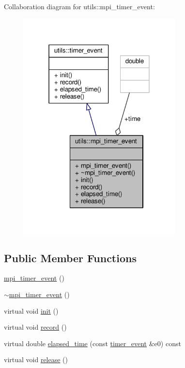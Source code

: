 Collaboration diagram for utils\-:\-:mpi\-\_\-timer\-\_\-event\-:\nopagebreak
\begin{figure}[H]
\begin{center}
\leavevmode
\includegraphics[width=235pt]{structutils_1_1mpi__timer__event__coll__graph}
\end{center}
\end{figure}
\subsection*{Public Member Functions}
\begin{DoxyCompactItemize}
\item 
\hyperlink{structutils_1_1mpi__timer__event_ae2772a320fa0db06f2634fded07de40f}{mpi\-\_\-timer\-\_\-event} ()
\item 
\hyperlink{structutils_1_1mpi__timer__event_aca22e55f931fd380b31024d3273229b5}{$\sim$mpi\-\_\-timer\-\_\-event} ()
\item 
virtual void \hyperlink{structutils_1_1mpi__timer__event_a0527b2cb58983cc22521a79cadada734}{init} ()
\item 
virtual void \hyperlink{structutils_1_1mpi__timer__event_a7c3bae9bcc4ec16fa7eef35fc03b8326}{record} ()
\item 
virtual double \hyperlink{structutils_1_1mpi__timer__event_a45dae6ae22f26fcaa7ff8c6f417e7bbe}{elapsed\-\_\-time} (const \hyperlink{structutils_1_1timer__event}{timer\-\_\-event} \&e0) const 
\item 
virtual void \hyperlink{structutils_1_1mpi__timer__event_a8929b157ca17992c0d2101eb099a7cc7}{release} ()
\end{DoxyCompactItemize}
